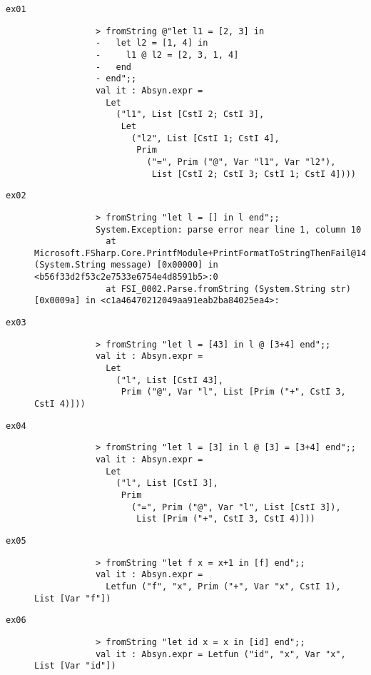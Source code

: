 \begin{description}
    \item[\texttt{ex01}]
        \begin{verbatim}
            > fromString @"let l1 = [2, 3] in
            -   let l2 = [1, 4] in
            -     l1 @ l2 = [2, 3, 1, 4]
            -   end
            - end";;
            val it : Absyn.expr =
              Let
                ("l1", List [CstI 2; CstI 3],
                 Let
                   ("l2", List [CstI 1; CstI 4],
                    Prim
                      ("=", Prim ("@", Var "l1", Var "l2"),
                       List [CstI 2; CstI 3; CstI 1; CstI 4])))
        \end{verbatim}
    \item[\texttt{ex02}]
        \begin{verbatim}
            > fromString "let l = [] in l end";;
            System.Exception: parse error near line 1, column 10
              at Microsoft.FSharp.Core.PrintfModule+PrintFormatToStringThenFail@1433[TResult].Invoke (System.String message) [0x00000] in <b56f33d2f53c2e7533e6754e4d8591b5>:0
              at FSI_0002.Parse.fromString (System.String str) [0x0009a] in <c1a46470212049aa91eab2ba84025ea4>:
        \end{verbatim}
    \item[\texttt{ex03}]
        \begin{verbatim}
            > fromString "let l = [43] in l @ [3+4] end";;
            val it : Absyn.expr =
              Let
                ("l", List [CstI 43],
                 Prim ("@", Var "l", List [Prim ("+", CstI 3, CstI 4)]))
        \end{verbatim}
    \item[\texttt{ex04}]
        \begin{verbatim}
            > fromString "let l = [3] in l @ [3] = [3+4] end";;
            val it : Absyn.expr =
              Let
                ("l", List [CstI 3],
                 Prim
                   ("=", Prim ("@", Var "l", List [CstI 3]),
                    List [Prim ("+", CstI 3, CstI 4)]))
        \end{verbatim}
    \item[\texttt{ex05}]
        \begin{verbatim}
            > fromString "let f x = x+1 in [f] end";;
            val it : Absyn.expr =
              Letfun ("f", "x", Prim ("+", Var "x", CstI 1), List [Var "f"])
        \end{verbatim}
    \item[\texttt{ex06}]
        \begin{verbatim}
            > fromString "let id x = x in [id] end";;
            val it : Absyn.expr = Letfun ("id", "x", Var "x", List [Var "id"])
        \end{verbatim}
\end{description}

